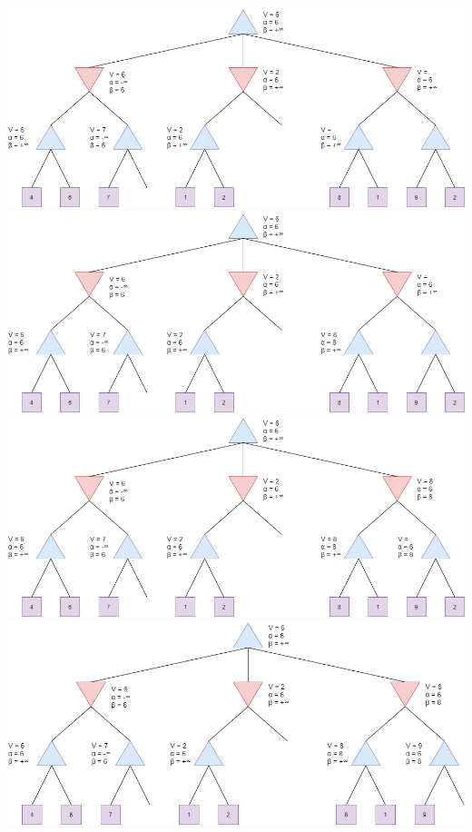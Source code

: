 \documentclass[]{scrreprt}
\begin{document}
\includegraphics[scale=0.45]{step8} \newline \newline \newline
\includegraphics[scale=0.45]{step9} \newline \newline
\includegraphics[scale=0.45]{step10} \newline \newline \newline
\includegraphics[scale=0.45]{step11} \newline \newline
\end{document}
